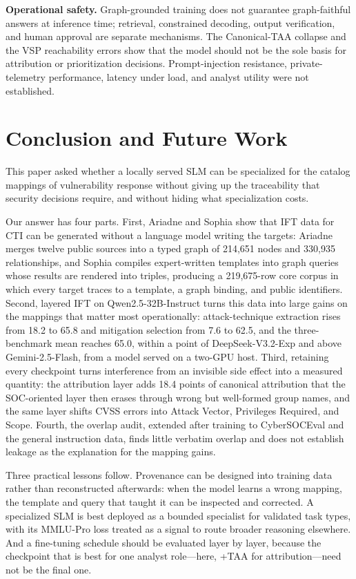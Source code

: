 \documentclass[conference]{IEEEtran}
\begin{document}
\textbf{Operational safety.} Graph-grounded training does not guarantee graph-faithful answers at inference time; retrieval, constrained decoding, output verification, and human approval are separate mechanisms. The Canonical-TAA collapse and the VSP reachability errors show that the model should not be the sole basis for attribution or prioritization decisions. Prompt-injection resistance, private-telemetry performance, latency under load, and analyst utility were not established.

\section{Conclusion and Future Work}
This paper asked whether a locally served SLM can be specialized for the catalog mappings of vulnerability response without giving up the traceability that security decisions require, and without hiding what specialization costs.

Our answer has four parts. First, Ariadne and Sophia show that IFT data for CTI can be generated without a language model writing the targets: Ariadne merges twelve public sources into a typed graph of 214,651 nodes and 330,935 relationships, and Sophia compiles expert-written templates into graph queries whose results are rendered into triples, producing a 219,675-row core corpus in which every target traces to a template, a graph binding, and public identifiers. Second, layered IFT on Qwen2.5-32B-Instruct turns this data into large gains on the mappings that matter most operationally: attack-technique extraction rises from 18.2 to 65.8 and mitigation selection from 7.6 to 62.5, and the three-benchmark mean reaches 65.0, within a point of DeepSeek-V3.2-Exp and above Gemini-2.5-Flash, from a model served on a two-GPU host. Third, retaining every checkpoint turns interference from an invisible side effect into a measured quantity: the attribution layer adds 18.4 points of canonical attribution that the SOC-oriented layer then erases through wrong but well-formed group names, and the same layer shifts CVSS errors into Attack Vector, Privileges Required, and Scope. Fourth, the overlap audit, extended after training to CyberSOCEval and the general instruction data, finds little verbatim overlap and does not establish leakage as the explanation for the mapping gains.

Three practical lessons follow. Provenance can be designed into training data rather than reconstructed afterwards: when the model learns a wrong mapping, the template and query that taught it can be inspected and corrected. A specialized SLM is best deployed as a bounded specialist for validated task types, with its MMLU-Pro loss treated as a signal to route broader reasoning elsewhere. And a fine-tuning schedule should be evaluated layer by layer, because the checkpoint that is best for one analyst role---here, +TAA for attribution---need not be the final one.
\end{document}
